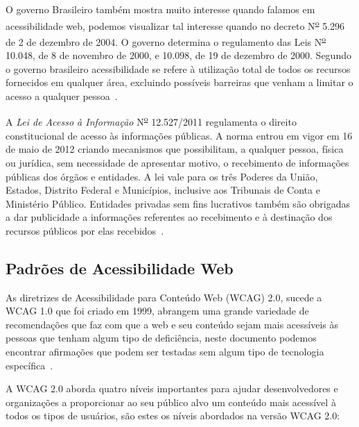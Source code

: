O governo Brasileiro tamb\'em mostra muito interesse quando falamos em
acessibilidade web, podemos visualizar tal interesse quando no decreto N\textsuperscript{\underline{o}} 5.296
de 2 de dezembro de 2004. O governo determina o regulamento das Leis
N\textsuperscript{\underline{o}} 10.048, de 8 de novembro de 2000, e 10.098, de
19 de dezembro de 2000. Segundo o governo brasileiro acessibilidade se refere
\`a utiliza\c{c}\~ao total de todos os recursos fornecidos em qualquer \'area,
excluindo poss\'iveis barreiras que venham a limitar o acesso a qualquer pessoa~\cite{AcessibilidadeBrasil}. 

A \emph{Lei de Acesso \`a Informa\c{c}\~ao} N\textsuperscript{\underline{o}} 12.527/2011 regulamenta o
direito constitucional de acesso \`as informa\c{c}\~oes p\'ublicas. A norma entrou em vigor em
16 de maio de 2012 criando mecanismos que possibilitam, a qualquer pessoa, 
f\'isica ou jur\'idica, sem necessidade de apresentar motivo, o recebimento de
informa\c{c}\~oes p\'ublicas dos \'org\~aos e entidades. A lei vale para os
tr\^es Poderes da Uni\~ao, Estados, Distrito Federal e Munic\'ipios, inclusive aos
Tribunais de Conta e Minist\'erio P\'ublico. Entidades privadas sem fins
lucrativos tamb\'em s\~ao obrigadas a dar publicidade a informa\c{c}\~oes referentes
ao recebimento e \`a destina\c{c}\~ao dos recursos p\'ublicos por elas
recebidos~\cite{LAI}.


\subsection{Padr\~oes de Acessibilidade Web}
\label{subsec:PadroesdeAcessibilidadeWeb}
 
As diretrizes de Acessibilidade para Conte\'udo Web (WCAG) 2.0, sucede a WCAG
1.0 que foi criado em 1999, abrangem uma grande variedade de recomenda\c{c}\~oes
que faz com que a web e seu conte\'udo sejam mais acess\'iveis \`as pessoas que
tenham algum tipo de defici\^encia, neste documento podemos encontrar afirma\c{c}\~oes que
podem ser testadas sem algum tipo de tecnologia espec\'ifica~\cite{Caldwell}. 

A WCAG 2.0 aborda quatro n\'iveis importantes para ajudar desenvolvedores e
organiza\c{c}\~oes a proporcionar ao seu p\'ublico alvo um conte\'udo mais
acess\'ivel \`a todos os tipos de usu\'arios, s\~ao estes os n\'iveis abordados
na vers\~ao WCAG 2.0:


